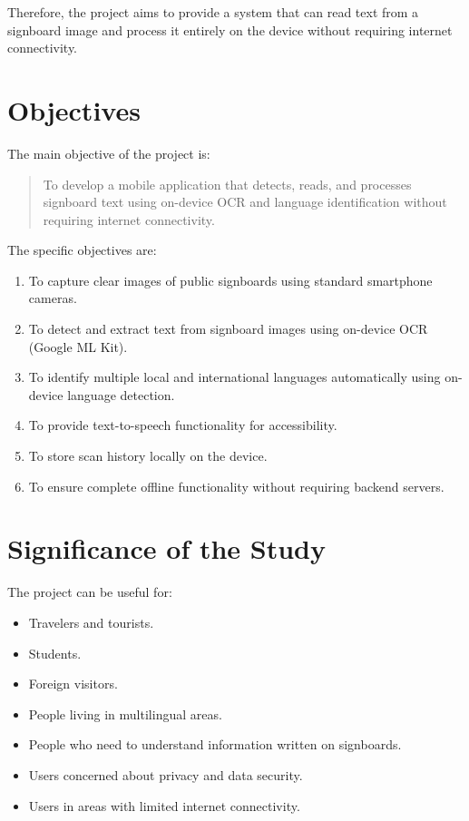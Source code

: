 \documentclass[12pt,a4paper]{report}
\begin{document}
Therefore, the project aims to provide a system that can read text from a signboard image and process it entirely on the device without requiring internet connectivity.

\section{Objectives}

The main objective of the project is:

\begin{quote}
To develop a mobile application that detects, reads, and processes signboard text using on-device OCR and language identification without requiring internet connectivity.
\end{quote}

The specific objectives are:

\begin{enumerate}
    \item To capture clear images of public signboards using standard smartphone cameras.
    
    \item To detect and extract text from signboard images using on-device OCR (Google ML Kit).
    
    \item To identify multiple local and international languages automatically using on-device language detection.
    
    \item To provide text-to-speech functionality for accessibility.
    
    \item To store scan history locally on the device.
    
    \item To ensure complete offline functionality without requiring backend servers.
\end{enumerate}

\section{Significance of the Study}

The project can be useful for:

\begin{itemize}
    \item Travelers and tourists.
    \item Students.
    \item Foreign visitors.
    \item People living in multilingual areas.
    \item People who need to understand information written on signboards.
    \item Users concerned about privacy and data security.
    \item Users in areas with limited internet connectivity.
\end{itemize}
\end{document}
